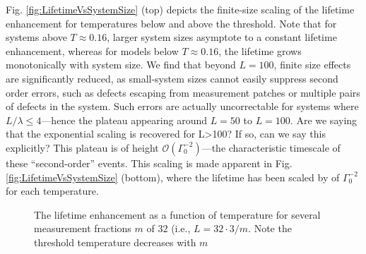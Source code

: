 \documentclass[twocolumn,superscriptaddress,aps,prb,floatfix]{revtex4-1}
\newcommand{\figref}[1]{Fig. \ref{#1}}
\newcommand{\MS}[1]{{\color{mauve} {#1}}}
\begin{document}
\figref{fig:LifetimeVsSystemSize} (top) depicts the finite-size scaling of the lifetime enhancement for temperatures below and above the threshold.  Note that for systems above $T\approx0.16$, larger system sizes asymptote to a constant lifetime enhancement, whereas for models below $T\approx0.16$, the lifetime grows monotonically with system size.  We find that beyond $L=100$, finite size effects are significantly reduced, as small-system sizes cannot easily suppress second order errors, such as defects escaping from measurement patches or multiple pairs of defects in the system.  Such errors are actually uncorrectable for systems where $L/\lambda \leq 4$---hence the plateau appearing around $L=50$ to $L=100$. \MS{Are we saying that the exponential scaling is recovered for L>100? If so, can we say this explicitly?} This plateau is of height $\mathcal{O}(\Gamma_0^{-2})$---the characteristic timescale of these ``second-order'' events.  This scaling is made apparent in \figref{fig:LifetimeVsSystemSize} (bottom), where the lifetime has been scaled by of $\Gamma_0^{-2}$ for each temperature.




\begin{figure}
\begin{center}
\end{center}
\caption{The lifetime enhancement as a function of temperature for several measurement fractions $m$ of $32$ (i.e., $L=32\cdot 3/m$.  Note the threshold temperature decreases  with $m$}
\label{fig:LifetimeVsMeasurementFraction}
\end{figure}
\end{document}
